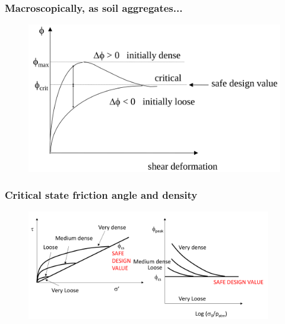 \documentclass[notes]{beamer}
\begin{document}
\begin{frame}
	\frametitle{Macroscopically, as soil aggregates...}
	\begin{figure}
		\includegraphics[width=\textwidth]{figs/macroscopic-friction.png}
	\end{figure}
\end{frame}


\begin{frame}
	\frametitle{Critical state friction angle and density}
	\begin{figure}
		\includegraphics[width=0.95\textwidth]{figs/sand-friction-angle.png}
	\end{figure}
\end{frame}
\end{document}
